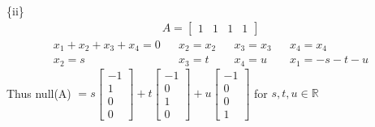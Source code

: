 \documentclass{article}
\begin{document}
\{ii\}
\begin{align*} A = 
    \begin{bmatrix}
        1 & 1 & 1 & 1
    \end{bmatrix}
\end{align*}
\begin{align*}
    x_1 + x_2 + x_3 + x_4 = 0 &&
    x_2 = x_2 && x_3 = x_3 && x_4 = x_4 \\
    x_2 = s && x_3 = t && x_4 = u && x_1 = -s -t - u
\end{align*}
Thus null(A) $ = s\begin{bmatrix} -1 \\ 1 \\ 0 \\ 0\end{bmatrix} + t\begin{bmatrix} -1 \\ 0 \\ 1 \\ 0\end{bmatrix} +u\begin{bmatrix} -1 \\ 0 \\ 0 \\ 1\end{bmatrix} $   for $s,t,u \in \mathbb{R}$ \newline
\end{document}
